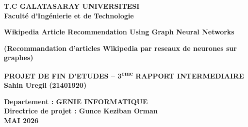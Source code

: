 \begin{titlepage}
    \begin{center}
        \large
        \vspace{-0.5cm}
        \textbf{T.C GALATASARAY UNIVERSITESI}\\
        \textbf{Facult\'e d'Ing\'enierie et de Technologie}
        \vspace{3.0cm}

        \textbf{Wikipedia Article Recommendation Using Graph Neural Networks}

        \textbf{(Recommandation d'articles Wikipedia par reseaux de neurones sur graphes)}

        \vspace{1.5cm}

        \textbf{PROJET DE FIN D'ETUDES -- 3\textsuperscript{eme} RAPPORT INTERMEDIAIRE}\\

        \textbf{Sahin Uregil (21401920)}

        \vspace{1.5cm}

        \textbf{Departement : GENIE INFORMATIQUE}\\
        \textbf{Directrice de projet : Gunce Keziban Orman}\\
        \vfill
        \textbf{MAI 2026}

    \end{center}
\end{titlepage}
\restoregeometry
